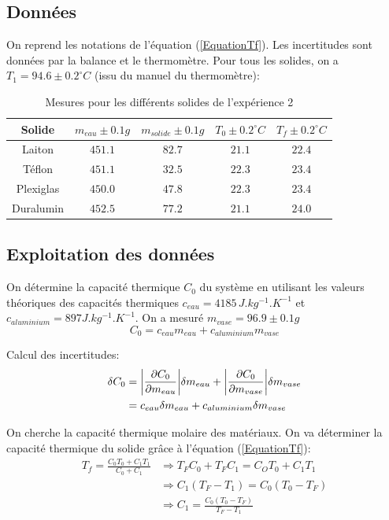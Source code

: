 \documentclass[12pt]{article}
\begin{document}
\subsection{Données}
On reprend les notations de l'équation (\ref{EquationTf}). Les incertitudes sont données par la balance et le thermomètre. Pour tous les solides, on a $T_1=94.6\pm 0.2^{\circ}C$ (issu du manuel du thermomètre):
\begin{table}[h!]
	\begin{center}
		\begin{tabular}{|c|c|c|c|c|}
		\hline
		Solide & $m_{eau} \pm 0.1g$ & $m_{solide}\pm 0.1g$ & $T_0\pm 0.2^{\circ}C$ & $T_f\pm 0.2^{\circ}C$\\ \hline
		Laiton & $451.1$ & $82.7$ & $21.1$ & $22.4$ \\
		Téflon & $451.1$ & $32.5$ & $22.3$ & $23.4$ \\
		Plexiglas & $450.0$ & $47.8$ & $22.3$ & $23.4$ \\
		Duralumin & $452.5$ & $77.2$ & $21.1$ & $24.0$ \\ \hline
		\end{tabular}
		\caption{Mesures pour les différents solides de l'expérience 2}
		\label{table:mesureexp2}
	\end{center}
\end{table}

\subsection{Exploitation des données}
On détermine la capacité thermique $C_0$ du système en utilisant les valeurs théoriques des capacités thermiques $c_{eau}=4185\, J.kg^{-1}.K^{-1}$ et $c_{aluminium}=897 J.kg^{-1}.K^{-1}$. On a mesuré $m_{vase}=96.9\pm 0.1g$
\begin{equation}
C_0=c_{eau}m_{eau}+c_{aluminium}m_{vase}
\end{equation}

Calcul des incertitudes:
\begin{align*}
\delta C_0&= \abs{\frac{\partial C_0}{\partial m_{eau}}} \delta m_{eau} + \abs{\frac{\partial C_0}{\partial m_{vase}}} \delta m_{vase}\\
&=c_{eau}\delta m_{eau}+c_{aluminium}\delta m_{vase}
\end{align*}

On cherche la capacité thermique molaire des matériaux. On va déterminer la capacité thermique du solide grâce à l'équation (\ref{EquationTf}):
\begin{align*}
T_f=\frac{C_0T_0+C_1T_1}{C_0+C_1} &\Rightarrow T_FC_0+T_FC_1=C_OT_0+C_1T_1 \\
&\Rightarrow C_1(T_F-T_1)=C_0(T_0-T_F) \\
&\Rightarrow C_1=\frac{C_0(T_0-T_F)}{T_F-T_1}
\end{align*}
\end{document}

